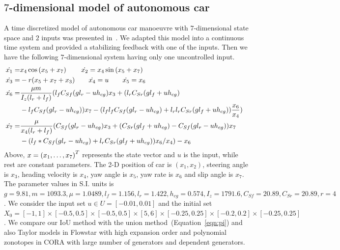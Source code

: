 %
\subsection{$7$-dimensional model of autonomous car}
A time discretized model of autonomous car manoeuvre with $7$-dimensional
state space and $2$ inputs was presented in~\cite{lavaei2020formal}.
We adapted this model into a continuous time system and provided a
stabilizing feedback with one of the inputs.  Then we have the
following $7$-dimensional system having only one
uncontrolled input.
%
\begin{align*}
\dot{x_1}  = & x_4\cos\rb{x_5+x_7}\hspace{2em} \dot{x_2} =
x_4\sin\rb{x_5+x_7}\\
%
\dot{x_3}  = & -r(x_5+x_7+x_3) \hspace{2em} \dot{x_4} =
 u \hspace{2em} \dot{x_5} = x_6 & \\
 \dot{x_6}  = & \frac{\mu
 m}{I_z(l_r+l_f)}(l_fC_{Sf}(gl_r-uh_{cg})x_3+
 (l_rC_{Sr}(gl_f+uh_{cg})\\& -l_fC_{Sf}(gl_r-uh_{cg}))x_7
 -(l_fl_fC_{Sf}(gl_r-uh_{cg}) + l_rl_rC_{Sr}(gl_f+uh_{cg}))\frac{x_6}{x_4})\\
%
\dot{x_7} 
= & \frac{\mu}{x_4(l_r+l_f)}(C_{Sf}(gl_r-uh_{cg})x_3+(C_{Sr}(gl_f+uh_{cg})-C_{Sf}(gl_r-uh_{cg}))x_7\\
&-(l_f*C_{Sf}(gl_r-uh_{cg}) + l_rC_{Sr}(gl_f+uh_{cg}))x_6/x_4)-x_6
\end{align*}
%
Above, $x = \left(x_1,\ldots,x_7\right)^T$ represents the state vector and $u$
is the input, while rest are constant parameters.  The 2-D position of
car is $(x_1,x_2)$, steering angle is $x_3$, heading velocity is
$x_4$, yaw angle is $x_5$, yaw rate is $x_6$ and slip angle is $x_7$.
The parameter values in S.I. units is 
%
$ g = 9.81, m = 1093.3, \mu = 1.0489, l_f = 1.156, l_r = 1.422, h_{cg}
  = 0.574, I_z = 1791.6, C_{Sf} = 20.89, C_{Sr} = 20.89, r = 4$.  We
  consider the input set $u\in U = [-0.01,0.01]$ and the initial set
  $X_0 =
  [-1,1]\times[-0.5,0.5]\times[-0.5,0.5]\times[5,6]\times[-0.25,0.25]\times[-0.2,0.2]\times[-0.25,0.25]$.
  We compare our IoU method with the union
  method~(Equation~\ref{eqn:pi}) and also Taylor models in Flowstar
  with high expansion order and polynomial zonotopes in CORA with
  large number of generators and dependent generators.

